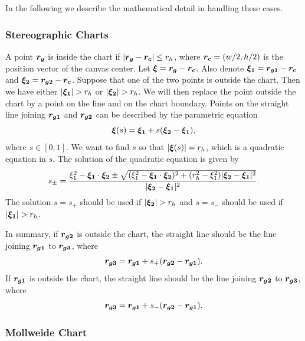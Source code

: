 \documentclass[12pt]{article}
\newcommand \beq {\begin{equation}}
\newcommand \eeq {\end{equation}}
\newcommand{\ve}[1]{\mbox{\boldmath $#1$}}
\begin{document}
In the following we describe the mathematical detail in handling these 
cases.

\subsubsection{Stereographic Charts}

A point $\ve{r_g}$ is inside the chart if $|\ve{r_g}-\ve{r_c}| \leq r_h$, 
where $\ve{r_c}=(w/2,h/2)$ is the position vector of the canvas center. 
Let $\ve{\xi}=\ve{r_g}-\ve{r_c}$. Also denote $\ve{\xi_1}=\ve{r_{g1}}-\ve{r_c}$ 
and $\ve{\xi_2}=\ve{r_{g2}}-\ve{r_c}$. Suppose that one of the two points is 
outside the chart. Then we have either $|\ve{\xi_1}|>r_h$ or $|\ve{\xi_2}|>r_h$. 
We will then replace the point outside the chart by a point on the line and on 
the chart boundary. Points on the straight line joining $\ve{r_{g1}}$ and 
$\ve{r_{g2}}$ can be described by the parametric equation 
\beq
  \ve{\xi}(s) = \ve{\xi_1} + s(\ve{\xi_2}-\ve{\xi_1}) ,
\eeq
where $s \in [0,1]$. We want to find $s$ so that $|\ve{\xi}(s)|=r_h$, 
which is a quadratic equation in $s$. The solution of the quadratic equation 
is given by 
\beq
  s_{\pm} = \frac{\xi_1^2 - \ve{\xi_1}\cdot \ve{\xi_2} \pm 
\sqrt{(\xi_1^2 - \ve{\xi_1}\cdot \ve{\xi_2})^2 + (r_h^2-\xi_1^2) |\ve{\xi_2}-\ve{\xi_1}|^2}}
{|\ve{\xi_2}-\ve{\xi_1}|^2} .
\eeq
The solution $s=s_+$ should be used if $|\ve{\xi_2}|>r_h$ and $s=s_-$ should be 
used if $|\ve{\xi_1}|>r_h$.

In summary, if $\ve{r_{g2}}$ is outside the chart, the straight line should be 
the line joining $\ve{r_{g1}}$ to $\ve{r_{g3}}$, where 
\beq
  \ve{r_{g3}} = \ve{r_{g1}} + s_+ (\ve{r_{g2}}-\ve{r_{g1}}) .
\eeq
If $\ve{r_{g1}}$ is outside the chart, the straight line should be
the line joining $\ve{r_{g2}}$ to $\ve{r_{g3}}$, where
\beq
  \ve{r_{g3}} = \ve{r_{g1}} + s_- (\ve{r_{g2}}-\ve{r_{g1}}) .
\eeq

\subsubsection{Mollweide Chart} 
\end{document}
